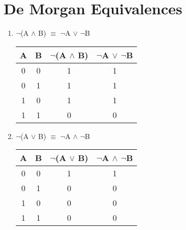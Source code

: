 \documentclass{report}
\begin{document}
\section{De Morgan Equivalences}



\begin{enumerate}



  \item $\neg$(A $\land$ B) $\equiv$ $\neg$A $\lor$ $\neg$B



\begin{center}

  \begin{tabular}{| c | c | c | c |}

    \hline

    A & B & $\neg$(A $\land$ B) & $\neg$A $\lor$ $\neg$B \\ \hline

    0 & 0 & 1 & 1 \\

    0 & 1 & 1 & 1 \\ 

    1 & 0 & 1 & 1 \\

    1 & 1 & 0 & 0 \\ \hline

  \end{tabular}

\end{center}



  \item $\neg$(A $\lor$ B) $\equiv$ $\neg$A $\land$ $\neg$B



\begin{center}

  \begin{tabular}{| c | c | c | c |}

    \hline

    A & B & $\neg$(A $\lor$ B) & $\neg$A $\land$ $\neg$B \\ \hline

    0 & 0 & 1 & 1 \\

    0 & 1 & 0 & 0 \\ 

    1 & 0 & 0 & 0 \\

    1 & 1 & 0 & 0 \\ \hline

  \end{tabular}

\end{center}

\end{enumerate}
\end{document}
